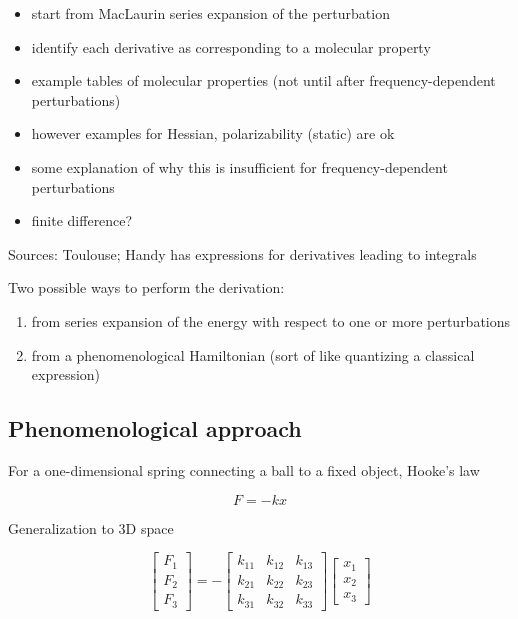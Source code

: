 \documentclass[%
class = book,%
crop = false,%
float = true,%
multi = true,%
preview = false,%
]{standalone}
\begin{document}
\begin{itemize}
\item start from MacLaurin series expansion of the perturbation
\item identify each derivative as corresponding to a molecular property
\item example tables of molecular properties (not until after frequency-dependent perturbations)
\item however examples for Hessian, polarizability (static) are ok
\item some explanation of why this is insufficient for frequency-dependent perturbations
\item finite difference?
\end{itemize}

Sources: Toulouse; Handy has expressions for derivatives leading to integrals

Two possible ways to perform the derivation:

\begin{enumerate}
\item from series expansion of the energy with respect to one or more perturbations
\item from a phenomenological Hamiltonian (sort of like quantizing a classical expression)
\end{enumerate}

\subsection{Phenomenological approach}

For a one-dimensional spring connecting a ball to a fixed object, Hooke's law

\begin{equation}
  F = -k x
  \label{eq:hooke_1d}
\end{equation}

Generalization to 3D space

\begin{equation}
  \begin{bmatrix}
    F_{1} \\ F_{2} \\ F_{3}
  \end{bmatrix}
  = -
  \begin{bmatrix}
    k_{11} & k_{12} & k_{13} \\
    k_{21} & k_{22} & k_{23} \\
    k_{31} & k_{32} & k_{33}
  \end{bmatrix}
  \begin{bmatrix}
    x_{1} \\ x_{2} \\ x_{3}
  \end{bmatrix}
\end{equation}
\end{document}
